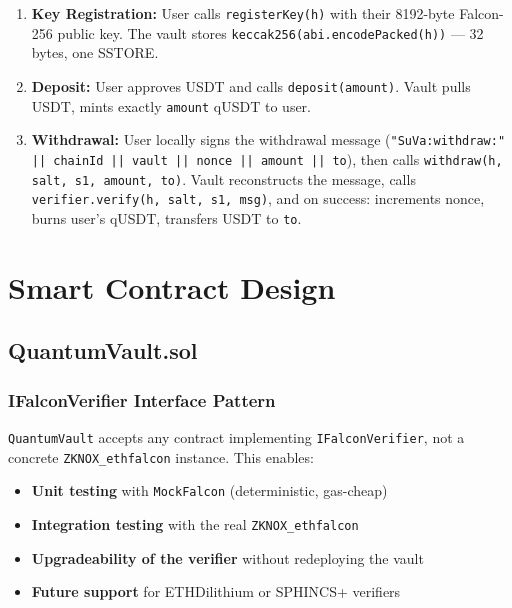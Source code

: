 \documentclass[11pt,a4paper]{article}
\begin{document}
\begin{enumerate}
  \item \textbf{Key Registration:} User calls \texttt{registerKey(h)} with their 8192-byte Falcon-256 public key. The vault stores \texttt{keccak256(abi.encodePacked(h))} — 32 bytes, one SSTORE.
  \item \textbf{Deposit:} User approves USDT and calls \texttt{deposit(amount)}. Vault pulls USDT, mints exactly \texttt{amount} qUSDT to user.
  \item \textbf{Withdrawal:} User locally signs the withdrawal message (\texttt{"SuVa:withdraw:" || chainId || vault || nonce || amount || to}), then calls \texttt{withdraw(h, salt, s1, amount, to)}. Vault reconstructs the message, calls \texttt{verifier.verify(h, salt, s1, msg)}, and on success: increments nonce, burns user's qUSDT, transfers USDT to \texttt{to}.
\end{enumerate}

\newpage
\section{Smart Contract Design}

\subsection{QuantumVault.sol}

\subsubsection{IFalconVerifier Interface Pattern}

\begin{infobox}
\texttt{QuantumVault} accepts any contract implementing \texttt{IFalconVerifier}, not a concrete \texttt{ZKNOX\_ethfalcon} instance. This enables:
\begin{itemize}
  \item \textbf{Unit testing} with \texttt{MockFalcon} (deterministic, gas-cheap)
  \item \textbf{Integration testing} with the real \texttt{ZKNOX\_ethfalcon}
  \item \textbf{Upgradeability of the verifier} without redeploying the vault
  \item \textbf{Future support} for ETHDilithium or SPHINCS+ verifiers
\end{itemize}
\end{infobox}
\end{document}
